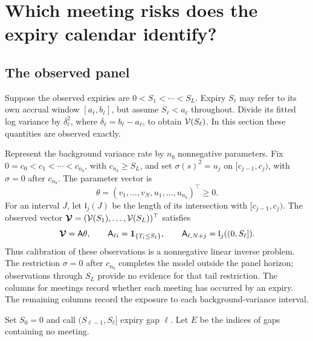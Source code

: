 \section{Which meeting risks does the expiry calendar identify?}\label{sec:calendar}
\subsection{The observed panel}
Suppose the observed expiries are $0<S_1<\cdots<S_L$. Expiry $S_\ell$ may refer to its own accrual window $[a_\ell,b_\ell]$, but assume $S_\ell<a_\ell$ throughout. Divide its fitted log variance by $\delta_\ell^2$, where $\delta_\ell=b_\ell-a_\ell$, to obtain $\mathcal V(S_\ell)$. In this section these quantities are observed exactly.

Represent the background variance rate by $n_b$ nonnegative parameters. Fix $0=c_0<c_1<\cdots<c_{n_b}$, with $c_{n_b}\geq S_L$, and set $\sigma(s)^2=u_j$ on $[c_{j-1},c_j)$, with $\sigma=0$ after $c_{n_b}$. The parameter vector is
\[
\theta=(v_1,\ldots,v_N,u_1,\ldots,u_{n_b})^\top\geq0.
\]
For an interval $J$, let $\mathfrak l_j(J)$ be the length of its intersection with $[c_{j-1},c_j)$. The observed vector $\boldsymbol{\mathcal V}=(\mathcal V(S_1),\ldots,\mathcal V(S_L))^\top$ satisfies
\begin{equation}\label{eq:panel}
\boldsymbol{\mathcal V}=\mathsf A\theta,\qquad
\mathsf A_{\ell i}=\mathbf 1_{\{T_i\leq S_\ell\}},\qquad
\mathsf A_{\ell,N+j}=\mathfrak l_j((0,S_\ell]).
\end{equation}
Thus calibration of these observations is a nonnegative linear inverse problem. The restriction $\sigma=0$ after $c_{n_b}$ completes the model outside the panel horizon; observations through $S_L$ provide no evidence for that tail restriction. The columns for meetings record whether each meeting has occurred by an expiry. The remaining columns record the exposure to each background-variance interval.

Set $S_0=0$ and call $(S_{\ell-1},S_\ell]$ expiry gap $\ell$. Let $E$ be the indices of gaps containing no meeting.

